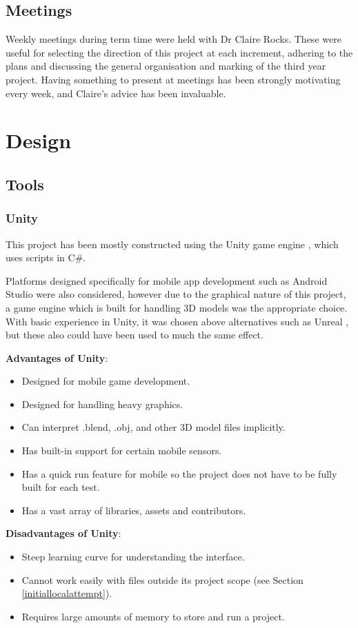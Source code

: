 \documentclass[12pt, a4paper]{article}
\begin{document}
\subsection{Meetings}
Weekly meetings during term time were held with Dr Claire Rocks. These were useful for selecting the direction of this project at each increment, adhering to the plans and discussing the general organisation and marking of the third year project. Having something to present at meetings has been strongly motivating every week, and Claire's advice has been invaluable.

\section{Design}
\subsection{Tools}
\subsubsection{Unity}
This project has been mostly constructed using the Unity game engine \cite{design:unity}, which uses scripts in C\#. 

Platforms designed specifically for mobile app development such as Android Studio \cite{design:android} were also considered, however due to the graphical nature of this project, a game engine which is built for handling 3D models was the appropriate choice. With basic experience in Unity, it was chosen above alternatives such as Unreal \cite{design:unreal}, but these also could have been used to much the same effect.

\textbf{Advantages of Unity}:
\begin{itemize}
    \item Designed for mobile game development.
    \item Designed for handling heavy graphics.
    \item Can interpret .blend, .obj, and other 3D model files implicitly.
    \item Has built-in support for certain mobile sensors.
    \item Has a quick run feature for mobile so the project does not have to be fully built for each test. 
    \item Has a vast array of libraries, assets and contributors.
\end{itemize}

\textbf{Disadvantages of Unity}:
\begin{itemize}
    \item Steep learning curve for understanding the interface.
    \item Cannot work easily with files outside its project scope (see Section \ref{initiallocalattempt}).
    \item Requires large amounts of memory to store and run a project.
\end{itemize}
\end{document}

